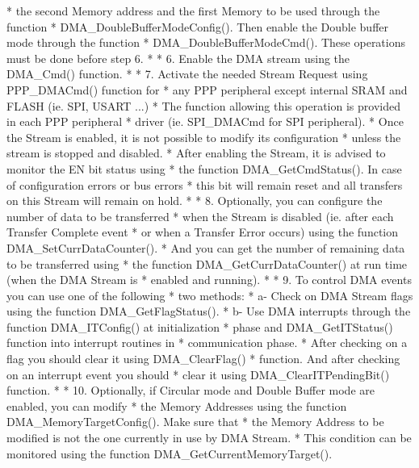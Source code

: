 \begin{DoxyVerb}
*             the second Memory address and the first Memory to be used through the function 
*             DMA_DoubleBufferModeConfig(). Then enable the Double buffer mode through the function
*             DMA_DoubleBufferModeCmd(). These operations must be done before step 6.
*    
*          6. Enable the DMA stream using the DMA_Cmd() function. 
*                
*          7. Activate the needed Stream Request using PPP_DMACmd() function for
*             any PPP peripheral except internal SRAM and FLASH (ie. SPI, USART ...)
*             The function allowing this operation is provided in each PPP peripheral
*             driver (ie. SPI_DMACmd for SPI peripheral).
*             Once the Stream is enabled, it is not possible to modify its configuration
*             unless the stream is stopped and disabled.
*             After enabling the Stream, it is advised to monitor the EN bit status using
*             the function DMA_GetCmdStatus(). In case of configuration errors or bus errors
*             this bit will remain reset and all transfers on this Stream will remain on hold.      
*
*          8. Optionally, you can configure the number of data to be transferred
*             when the Stream is disabled (ie. after each Transfer Complete event
*             or when a Transfer Error occurs) using the function DMA_SetCurrDataCounter().
*             And you can get the number of remaining data to be transferred using 
*             the function DMA_GetCurrDataCounter() at run time (when the DMA Stream is
*             enabled and running).  
*                   
*          9. To control DMA events you can use one of the following 
*              two methods:
*               a- Check on DMA Stream flags using the function DMA_GetFlagStatus().  
*               b- Use DMA interrupts through the function DMA_ITConfig() at initialization
*                  phase and DMA_GetITStatus() function into interrupt routines in
*                  communication phase.  
*              After checking on a flag you should clear it using DMA_ClearFlag()
*              function. And after checking on an interrupt event you should 
*              clear it using DMA_ClearITPendingBit() function.    
*              
*          10. Optionally, if Circular mode and Double Buffer mode are enabled, you can modify
*              the Memory Addresses using the function DMA_MemoryTargetConfig(). Make sure that
*              the Memory Address to be modified is not the one currently in use by DMA Stream.
*              This condition can be monitored using the function DMA_GetCurrentMemoryTarget().

\end{DoxyVerb}
